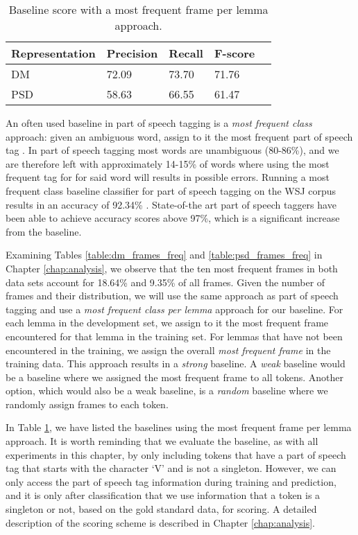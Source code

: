 \begin{table}
    \centering
    \smaller[0.2]
    \begin{tabular}{@{}lllll@{}}
        \toprule
        \textbf{Representation} & \textbf{Precision} & \textbf{Recall} & \textbf{F-score} \\
        \midrule
        DM & 72.09 & 73.70 & 71.76\\ 
        PSD & 58.63 & 66.55 & 61.47\\
        \bottomrule
    \end{tabular}
    \caption{Baseline score with a most frequent frame per lemma approach.}
    \label{table:baseline}
\end{table}

An often used baseline in part of speech tagging is a \textit{most frequent class} approach: given an ambiguous word, assign to it the most frequent part of speech tag \cite{Jur:Mar:09}. In part of speech tagging most words are unambiguous (80-86\%), and we are therefore left with approximately 14-15\% of words where using the most frequent tag for for said word will results in possible errors. Running a most frequent class baseline classifier for part of speech tagging on the WSJ corpus results in an accuracy of 92.34\% \cite{Jur:Mar:09}. State-of-the art part of speech taggers have been able to achieve accuracy scores above 97\%, which is a significant increase from the baseline.

Examining Tables \ref{table:dm_frames_freq} and \ref{table:psd_frames_freq} in Chapter \ref{chap:analysis}, we observe that the ten most frequent frames in both data sets account for 18.64\% and 9.35\% of all frames. Given the number of frames and their distribution, we will use the same approach as part of speech tagging and use a \textit{most frequent class per lemma} approach for our baseline. For each lemma in the development set, we assign to it the most frequent frame encountered for that lemma in the training set. For lemmas that have not been encountered in the training, we assign the overall \textit{most frequent frame} in the training data. This approach results in a \textit{strong} baseline. A \textit{weak} baseline would be a baseline where we assigned the most frequent frame to all tokens. Another option, which would also be a weak baseline, is a \textit{random} baseline where we randomly assign frames to each token.

In Table \ref{table:baseline}, we have listed the baselines using the most frequent frame per lemma approach. It is worth reminding that we evaluate the baseline, as with all experiments in this chapter, by only including tokens that have a part of speech tag that starts with the character `V' and is not a singleton. However, we can only access the part of speech tag information during training and prediction, and it is only after classification that we use information that a token is a singleton or not, based on the gold standard data, for scoring. A detailed description of the scoring scheme is described in Chapter \ref{chap:analysis}.

